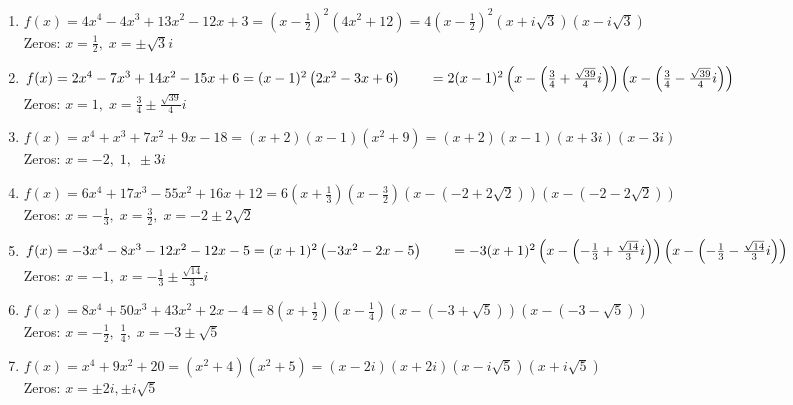 \begin{enumerate}
\item $f(x) = 4x^{4} - 4x^{3} + 13x^{2} - 12x + 3 = \left(x - \frac{1}{2}\right)^{2}\left(4x^{2} + 12\right) = 4\left(x - \frac{1}{2}\right)^{2}(x + i\sqrt{3})(x - i\sqrt{3})$\\
Zeros: $x = \frac{1}{2}, \; x = \pm \sqrt{3}i$

\item $f(x) = 2x^4-7x^3+14x^2-15x+6 = (x-1)^2 \left(2x^2 - 3x + 6\right)  \\
\phantom{f(x)} = 2 (x-1)^2 \left( x - \left( \frac{3}{4} +  \frac{\sqrt{39}}{4} i \right) \right)  \left( x - \left( \frac{3}{4} -  \frac{\sqrt{39}}{4} i \right) \right) $ \\
Zeros: $x = 1, \; x = \frac{3}{4}  \pm  \frac{\sqrt{39}}{4} i$



\item  $f(x) = x^4+x^3+7x^2+9x-18 = (x+2)(x-1)\left(x^2+9\right) = (x+2)(x-1)(x+3i)(x-3i)$\\
Zeros:  $x = -2, \; 1, \; \pm 3i$

\item  $f(x) = 6x^4+17x^3-55x^2+16x+12 = 6 \left(x + \frac{1}{3} \right) \left(x - \frac{3}{2} \right) \left(x - \left( -2 + 2 \sqrt{2}\right)\right) \left(x - \left( -2 - 2 \sqrt{2}\right)\right)$ \\
Zeros:  $x = -\frac{1}{3}, \; x = \frac{3}{2}, \; x = -2 \pm 2 \sqrt{2}$


\item  $f(x) = -3x^4-8x^3-12x^2-12x-5 = (x+1)^2 \left(-3x^2-2x-5\right) \\
\phantom{f(x)}= -3(x+1)^2\left(x - \left( -\frac{1}{3}+\frac{\sqrt{14}}{3} i\right) \right) \left(x - \left( -\frac{1}{3}-\frac{\sqrt{14}}{3} i\right) \right)$ \\
Zeros:  $x = -1, \; x = -\frac{1}{3} \pm \frac{\sqrt{14}}{3} i$

\item  $f(x) = 8x^4+50x^3+43x^2+2x-4 = 8\left(x + \frac{1}{2}\right) \left(x - \frac{1}{4}\right)(x - (-3 + \sqrt{5}))(x - (-3 - \sqrt{5}))$ \\
Zeros:  $x = -\frac{1}{2}, \; \frac{1}{4}, \; x = -3 \pm \sqrt{5}$

\item  $f(x) = x^4+9x^2+20 = \left(x^2+4\right) \left(x^2+5\right) = (x-2i)(x+2i)\left(x - i \sqrt{5}\right)\left(x + i \sqrt{5}\right)$\\
Zeros:  $x = \pm 2i, \pm i \sqrt{5}$



\end{enumerate}
